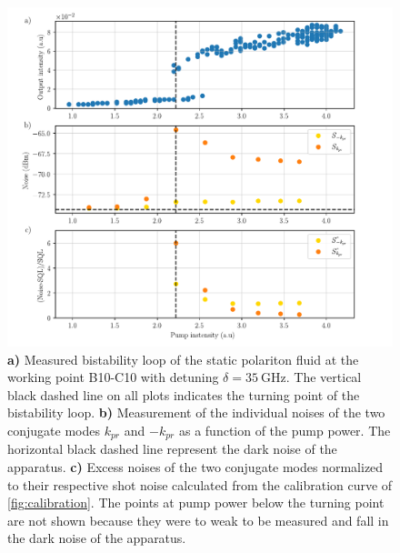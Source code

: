 \begin{figure}
    \centering
    \includegraphics[width=1\textwidth]{chap_correlation/fig/noises_vs_bistab.pdf}
    \caption{\textbf{a)} Measured bistability loop of the static polariton fluid at the working point B10-C10 with detuning $\delta=\SI{35}{\giga\hertz}$. The vertical black dashed line on all plots
    indicates the turning point of the bistability loop. \textbf{b)} Measurement of the individual noises of the two conjugate modes $k_{pr}$ and $-k_{pr}$ as a function of the pump power. The horizontal black dashed line represent the dark noise of the apparatus.
    \textbf{c)} Excess noises of the two conjugate modes normalized to their respective shot noise calculated from the calibration curve of \autoref{fig:calibration}. The points at pump power below the turning point are not shown because they were to weak to be measured and fall in the dark noise of the apparatus.}
    \label{fig:noises_vs_bistab}
\end{figure}


